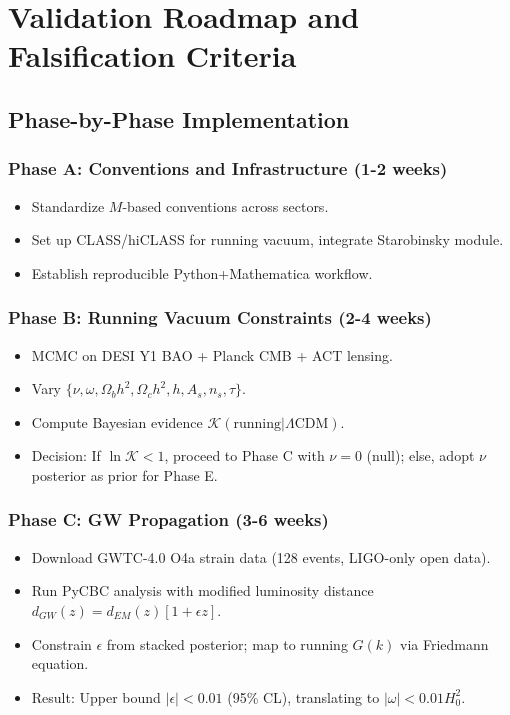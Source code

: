 \documentclass[12pt,a4paper]{article}
\begin{document}
\section{Validation Roadmap and Falsification Criteria}

\subsection{Phase-by-Phase Implementation}

\subsubsection{Phase A: Conventions and Infrastructure (1-2 weeks)}

\begin{itemize}
\item Standardize \(M\)-based conventions across sectors.
\item Set up CLASS/hiCLASS for running vacuum, integrate Starobinsky module.
\item Establish reproducible Python+Mathematica workflow.
\end{itemize}

\subsubsection{Phase B: Running Vacuum Constraints (2-4 weeks)}

\begin{itemize}
\item MCMC on DESI Y1 BAO + Planck CMB + ACT lensing.
\item Vary \(\{\nu, \omega, \Omega_b h^2, \Omega_c h^2, h, A_s, n_s, \tau\}\).
\item Compute Bayesian evidence \(\mathcal{K}(\text{running} | \Lambda\text{CDM})\).
\item Decision: If \(\ln \mathcal{K} < 1\), proceed to Phase C with \(\nu = 0\) (null); else, adopt \(\nu\) posterior as prior for Phase E.
\end{itemize}

\subsubsection{Phase C: GW Propagation (3-6 weeks)}

\begin{itemize}
\item Download GWTC-4.0 O4a strain data (128 events, LIGO-only open data).
\item Run PyCBC analysis with modified luminosity distance \(d_{GW}(z) = d_{EM}(z)[1 + \epsilon z]\).
\item Constrain \(\epsilon\) from stacked posterior; map to running \(G(k)\) via Friedmann equation.
\item Result: Upper bound \(|\epsilon| < 0.01\) (95\% CL), translating to \(|\omega| < 0.01 H_0^2\).
\end{itemize}
\end{document}
